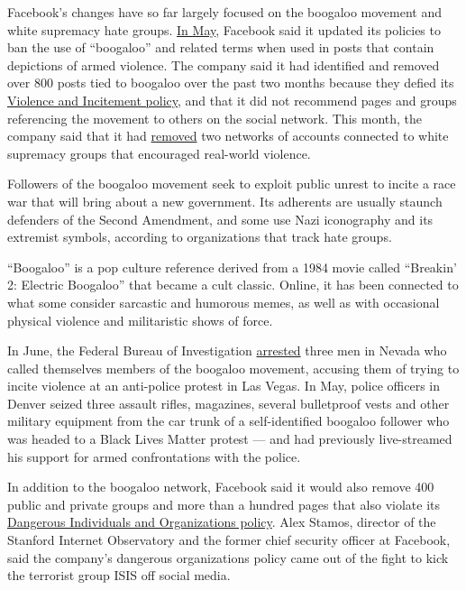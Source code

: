 Facebook's changes have so far largely focused on the boogaloo movement
and white supremacy hate groups.
\href{https://www.reuters.com/article/us-facebook-boogaloo/facebook-moves-to-limit-spread-of-boogaloo-groups-after-charges-idUSKBN23C011}{In
May}, Facebook said it updated its policies to ban the use of
``boogaloo'' and related terms when used in posts that contain
depictions of armed violence. The company said it had identified and
removed over 800 posts tied to boogaloo over the past two months because
they defied its
\href{https://www.facebook.com/communitystandards/credible_violence}{Violence
and Incitement policy}, and that it did not recommend pages and groups
referencing the movement to others on the social network. This month,
the company said that it had
\href{https://www.nytimes.com/aponline/2020/06/17/business/ap-us-america-protests-facebook-hate-groups.html}{removed}
two networks of accounts connected to white supremacy groups that
encouraged real-world violence.

Followers of the boogaloo movement seek to exploit public unrest to
incite a race war that will bring about a new government. Its adherents
are usually staunch defenders of the Second Amendment, and some use Nazi
iconography and its extremist symbols, according to organizations that
track hate groups.

``Boogaloo'' is a pop culture reference derived from a 1984 movie called
``Breakin' 2: Electric Boogaloo'' that became a cult classic. Online, it
has been connected to what some consider sarcastic and humorous memes,
as well as with occasional physical violence and militaristic shows of
force.

In June, the Federal Bureau of Investigation
\href{https://www.nytimes.com/2020/06/11/us/antifa-protests-george-floyd.html}{arrested}
three men in Nevada who called themselves members of the boogaloo
movement, accusing them of trying to incite violence at an anti-police
protest in Las Vegas. In May, police officers in Denver seized three
assault rifles, magazines, several bulletproof vests and other military
equipment from the car trunk of a self-identified boogaloo follower who
was headed to a Black Lives Matter protest --- and had previously
live-streamed his support for armed confrontations with the police.

In addition to the boogaloo network, Facebook said it would also remove
400 public and private groups and more than a hundred pages that also
violate its
\href{https://www.facebook.com/communitystandards/dangerous_individuals_organizations}{Dangerous
Individuals and Organizations policy}. Alex Stamos, director of the
Stanford Internet Observatory and the former chief security officer at
Facebook, said the company's dangerous organizations policy came out of
the fight to kick the terrorist group ISIS off social media.

